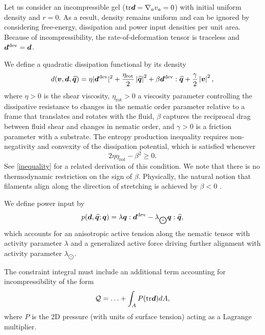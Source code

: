\documentclass[12pt]{iopart}
\begin{document}
	Let us consider an incompressible gel (${\rm tr}\bm{d} = \nabla_a v_a =0$) with initial uniform density and $r=0$. As a result, density remains uniform and can be ignored by considering free-energy, dissipation and power input densities per unit area. %
	Because of incompressibility, the rate-of-deformation tensor is traceless and  $\bm{d}^{\rm dev} = \bm{d}$.
	
	We define a quadratic dissipation functional by its density
	\begin{equation}
		\label{diss_inc}
		d(\bm{v},\bm{d},\widehat{\bm{q}}) = \eta \vert\bm{d}^{\rm dev}\vert^2 +\frac{\eta_{\text{rot}}}{2}  \left|\widehat{\bm{q}}\right|^2+ \beta  \bm{d}^{\rm dev}:\widehat{\bm{q}}  + \frac{\gamma}{2} \left|\bm{v}\right|^2,
	\end{equation}
	where $\eta>0$ is the shear viscosity, $\eta_{\text{rot}}>0$ a viscosity parameter controlling the dissipative resistance to changes in the nematic order parameter relative to a frame that  translates and rotates with the fluid, $\beta$ captures the reciprocal drag between fluid shear and changes in nematic order, and $\gamma>0$ is a friction parameter with a substrate.
	The entropy production inequality requires non-negativity and convexity of the dissipation potential, which is satisfied whenever
	\begin{equation}
		2\eta \eta_{\text{rot}}-\beta^2\ge0.
		\label{2nd_law}
	\end{equation}
See \ref{inequality} for a related derivation of this condition. We note that there is no thermodynamic restriction on the sign of $\beta$. Physically, the natural notion that filaments align along the direction of stretching is achieved by $\beta<0$ \cite{salbreux2009}.
	
	We define power input by
	\begin{equation}
		p(\bm{d},\widehat{\bm{q}};{\bm{q}}) =\lambda \bm{q}:\bm{d}^{\rm dev} - \lambda_{\bigodot}  \bm{q} : \widehat{\bm{q}},
	\end{equation}
	which accounts for an anisotropic active tension along the nematic tensor with activity parameter $\lambda$ and a generalized active force driving further alignment with activity parameter $\lambda_{\bigodot}$.
	
	The constraint integral must include an additional term accounting for incompressibility of the form
	\begin{equation} 
		\mathcal{Q} = \ldots + 
		\int_A P ({\rm tr} \bm{d}) dA, \label{eq:constraint_}
	\end{equation}
	where $P$ is the 2D pressure (with units of surface tension) acting as a Lagrange multiplier. 
	
\end{document}
